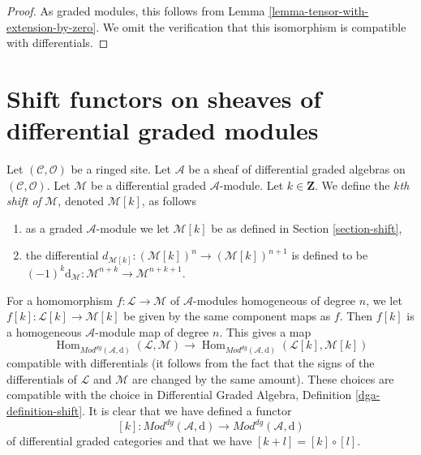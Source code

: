 \documentclass{stacks-project}
\theoremstyle{plain}
\theoremstyle{definition}
\theoremstyle{remark}
\numberwithin{equation}{subsection}
\def\Hom{\mathop{\mathrm{Hom}}\nolimits}
\begin{document}
\begin{proof}
As graded modules, this follows from
Lemma \ref{lemma-tensor-with-extension-by-zero}.
We omit the verification that this isomorphism
is compatible with differentials.
\end{proof}








\section{Shift functors on sheaves of differential graded modules}
\label{section-shift-dg}

\noindent
Let $(\mathcal{C}, \mathcal{O})$ be a ringed site.
Let $\mathcal{A}$ be a sheaf of differential graded algebras
on $(\mathcal{C}, \mathcal{O})$.
Let $\mathcal{M}$ be a differential graded $\mathcal{A}$-module.
Let $k \in \mathbf{Z}$. We define the {\it $k$th shift of} $\mathcal{M}$,
denoted $\mathcal{M}[k]$, as follows
\begin{enumerate}
\item as a graded $\mathcal{A}$-module we let $\mathcal{M}[k]$ be
as defined in Section \ref{section-shift},
\item the differential
$d_{\mathcal{M}[k]} : (\mathcal{M}[k])^n \to (\mathcal{M}[k])^{n + 1}$
is defined to be
$(-1)^k\text{d}_\mathcal{M} : \mathcal{M}^{n + k} \to \mathcal{M}^{n + k + 1}$.
\end{enumerate}
For a homomorphism $f : \mathcal{L} \to \mathcal{M}$ of $\mathcal{A}$-modules
homogeneous of degree $n$, we let $f[k] : \mathcal{L}[k] \to \mathcal{M}[k]$
be given by the same component maps as $f$. Then $f[k]$ is
a homogeneous $\mathcal{A}$-module map of degree $n$.
This gives a map
$$
\Hom_{\textit{Mod}^{dg}(\mathcal{A}, \text{d})}(\mathcal{L}, \mathcal{M})
\longrightarrow
\Hom_{\textit{Mod}^{dg}(\mathcal{A}, \text{d})}
(\mathcal{L}[k], \mathcal{M}[k])
$$
compatible with differentials (it follows from the fact
that the signs of the differentials of $\mathcal{L}$ and
$\mathcal{M}$ are changed by the same amount). These choices are
compatible with the choice in
Differential Graded Algebra, Definition \ref{dga-definition-shift}.
It is clear that we have defined a functor
$$
[k] :
\textit{Mod}^{dg}(\mathcal{A}, \text{d})
\longrightarrow
\textit{Mod}^{dg}(\mathcal{A}, \text{d})
$$
of differential graded categories and that we have
$[k + l] = [k] \circ [l]$.
\end{document}
